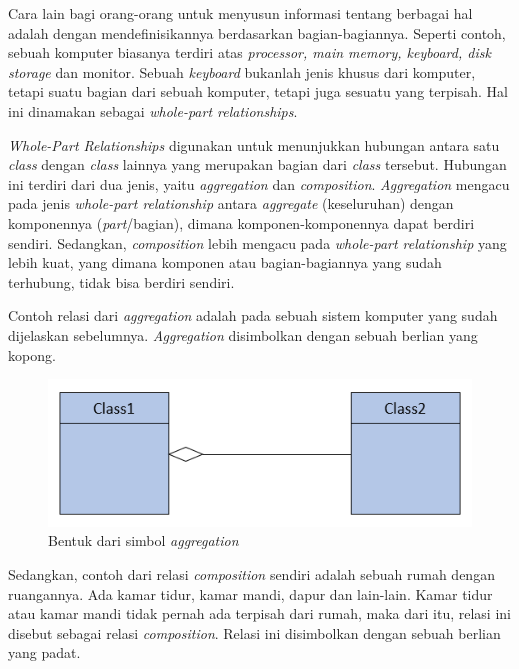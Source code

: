 \documentclass[a4paper]{article}
\begin{document}
\begin{enumerate}
\begin{enumerate}
\begin{itemize}
\begin{itemize}
                Cara lain bagi orang-orang untuk menyusun informasi tentang berbagai hal adalah dengan mendefinisikannya berdasarkan bagian-bagiannya. Seperti contoh, sebuah komputer biasanya terdiri atas \textit{processor, main memory, keyboard, disk storage} dan monitor. Sebuah \textit{keyboard} bukanlah jenis khusus dari komputer, tetapi suatu bagian dari sebuah komputer, tetapi juga sesuatu yang terpisah. Hal ini dinamakan sebagai \textit{whole-part relationships}\autocite[103-114]{uml-satzinger}.

                \textit{Whole-Part Relationships} digunakan untuk menunjukkan hubungan antara satu \textit{class} dengan \textit{class} lainnya yang merupakan bagian dari \textit{class} tersebut. Hubungan ini terdiri dari dua jenis, yaitu \textit{aggregation} dan \textit{composition}. \textit{Aggregation} mengacu pada jenis \textit{whole-part relationship} antara \textit{aggregate} (keseluruhan) dengan komponennya (\textit{part}/bagian), dimana komponen-komponennya dapat berdiri sendiri. Sedangkan, \textit{composition} lebih mengacu pada \textit{whole-part relationship} yang lebih kuat, yang dimana komponen atau bagian-bagiannya yang sudah terhubung, tidak bisa berdiri sendiri\autocite[103-114]{uml-satzinger}.

                Contoh relasi dari \textit{aggregation} adalah pada sebuah sistem komputer yang sudah dijelaskan sebelumnya. \textit{Aggregation} disimbolkan dengan sebuah berlian yang kopong\autocite[103-114]{uml-satzinger}.

                \begin{figure}[h]
                    \centering
                    \includegraphics[scale=0.5]{images/uml satzinger/domain class diagram/aggregation.png}
                    \caption{Bentuk dari simbol \textit{aggregation}}
                \end{figure}

                Sedangkan, contoh dari relasi \textit{composition} sendiri adalah sebuah rumah dengan ruangannya. Ada kamar tidur, kamar mandi, dapur dan lain-lain. Kamar tidur atau kamar mandi tidak pernah ada terpisah dari rumah, maka dari itu, relasi ini disebut sebagai relasi \textit{composition}. Relasi ini disimbolkan dengan sebuah berlian yang padat\autocite[103-114]{uml-satzinger}.


\end{itemize}
\end{itemize}
\end{enumerate}
\end{enumerate}
\end{document}
